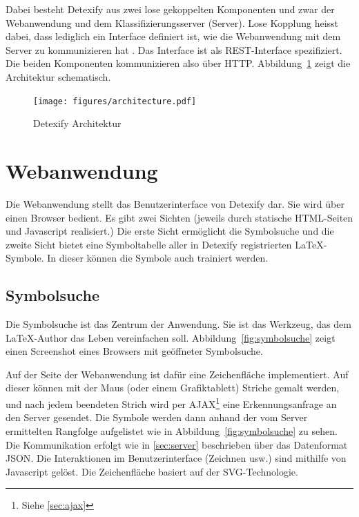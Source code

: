 Dabei besteht Detexify aus zwei lose gekoppelten Komponenten und zwar der Webanwendung und dem Klassifizierungsserver (Server). Lose Kopplung heisst dabei, dass lediglich ein Interface definiert ist, wie die Webanwendung mit dem Server zu kommunizieren hat \cite{Tilkov:2005p11813}. Das Interface ist als \ac{REST}-Interface spezifiziert. Die beiden Komponenten kommunizieren also über \ac{HTTP}. Abbildung~\ref{fig:architecture} zeigt die Architektur schematisch.

\begin{figure}
  \centering \texttt{[image: figures/architecture.pdf]}
  \caption{Detexify Architektur}
  \label{fig:architecture}
\end{figure}

\section{Webanwendung} %
\label{sec:webanwendung}


Die Webanwendung stellt das Benutzerinterface von Detexify dar. Sie wird über einen Browser bedient. Es gibt zwei Sichten (jeweils durch statische \ac{HTML}-Seiten und Javascript realisiert.) Die erste Sicht ermöglicht die Symbolsuche und die zweite Sicht bietet eine Symboltabelle aller in Detexify registrierten \LaTeX-Symbole. In dieser können die Symbole auch trainiert werden.

\subsection{Symbolsuche} %
\label{sub:symbolsuche}

Die Symbolsuche ist das Zentrum der Anwendung. Sie ist das Werkzeug, das dem \LaTeX-Author das Leben vereinfachen soll. Abbildung~\ref{fig:symbolsuche} zeigt einen Screenshot eines Browsers mit geöffneter Symbolsuche.

Auf der Seite der Webanwendung ist dafür eine Zeichenfläche implementiert. Auf dieser können mit der Maus (oder einem Grafiktablett) Striche gemalt werden, und nach jedem beendeten Strich wird per AJAX\footnote{Siehe \ref{sec:ajax}} eine Erkennungsanfrage an den Server gesendet. Die Symbole werden dann anhand der vom Server ermittelten Rangfolge aufgelistet wie in Abbildung~\ref{fig:symbolsuche} zu sehen. Die Kommunikation erfolgt wie in \ref{sec:server} beschrieben über das Datenformat \ac{JSON}. Die Interaktionen im Benutzerinterface (Zeichnen usw.) sind mithilfe von Javascript gelöst. Die Zeichenfläche basiert auf der \ac{SVG}-Technologie.

